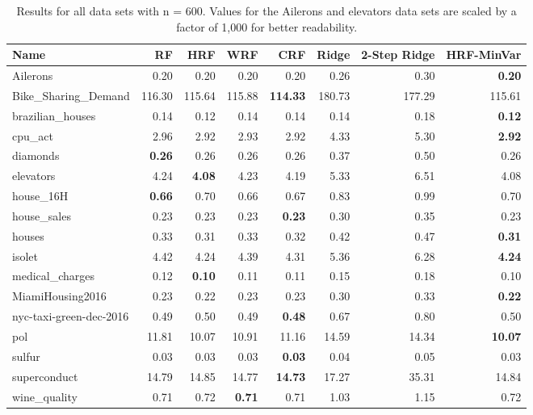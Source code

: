\begin{table}[ht]
\centering
\begingroup\scriptsize
\begin{tabular}{lrrrrrrr}
  \hline
\textbf{ Name } & \textbf{ RF } & \textbf{ HRF } & \textbf{ WRF } & \textbf{ CRF } & \textbf{ Ridge } & \textbf{ 2-Step Ridge } & \textbf{ HRF-MinVar } \\ 
  \hline
Ailerons & 0.20 & 0.20 & 0.20 & 0.20 & 0.26 & 0.30 & \textbf{0.20} \\ 
  Bike\_Sharing\_Demand & 116.30 & 115.64 & 115.88 & \textbf{114.33} & 180.73 & 177.29 & 115.61 \\ 
  brazilian\_houses & 0.14 & 0.12 & 0.14 & 0.14 & 0.14 & 0.18 & \textbf{0.12} \\ 
  cpu\_act & 2.96 & 2.92 & 2.93 & 2.92 & 4.33 & 5.30 & \textbf{2.92} \\ 
  diamonds & \textbf{0.26} & 0.26 & 0.26 & 0.26 & 0.37 & 0.50 & 0.26 \\ 
  elevators & 4.24 & \textbf{4.08} & 4.23 & 4.19 & 5.33 & 6.51 & 4.08 \\ 
  house\_16H & \textbf{0.66} & 0.70 & 0.66 & 0.67 & 0.83 & 0.99 & 0.70 \\ 
  house\_sales & 0.23 & 0.23 & 0.23 & \textbf{0.23} & 0.30 & 0.35 & 0.23 \\ 
  houses & 0.33 & 0.31 & 0.33 & 0.32 & 0.42 & 0.47 & \textbf{0.31} \\ 
  isolet & 4.42 & 4.24 & 4.39 & 4.31 & 5.36 & 6.28 & \textbf{4.24} \\ 
  medical\_charges & 0.12 & \textbf{0.10} & 0.11 & 0.11 & 0.15 & 0.18 & 0.10 \\ 
  MiamiHousing2016 & 0.23 & 0.22 & 0.23 & 0.23 & 0.30 & 0.33 & \textbf{0.22} \\ 
  nyc-taxi-green-dec-2016 & 0.49 & 0.50 & 0.49 & \textbf{0.48} & 0.67 & 0.80 & 0.50 \\ 
  pol & 11.81 & 10.07 & 10.91 & 11.16 & 14.59 & 14.34 & \textbf{10.07} \\ 
  sulfur & 0.03 & 0.03 & 0.03 & \textbf{0.03} & 0.04 & 0.05 & 0.03 \\ 
  superconduct & 14.79 & 14.85 & 14.77 & \textbf{14.73} & 17.27 & 35.31 & 14.84 \\ 
  wine\_quality & 0.71 & 0.72 & \textbf{0.71} & 0.71 & 1.03 & 1.15 & 0.72 \\ 
   \hline
\end{tabular}
\endgroup
\caption{Results for all data sets with n = 600. Values for the Ailerons and elevators data sets are scaled by a factor of 1,000 for better readability.} 
\end{table}
